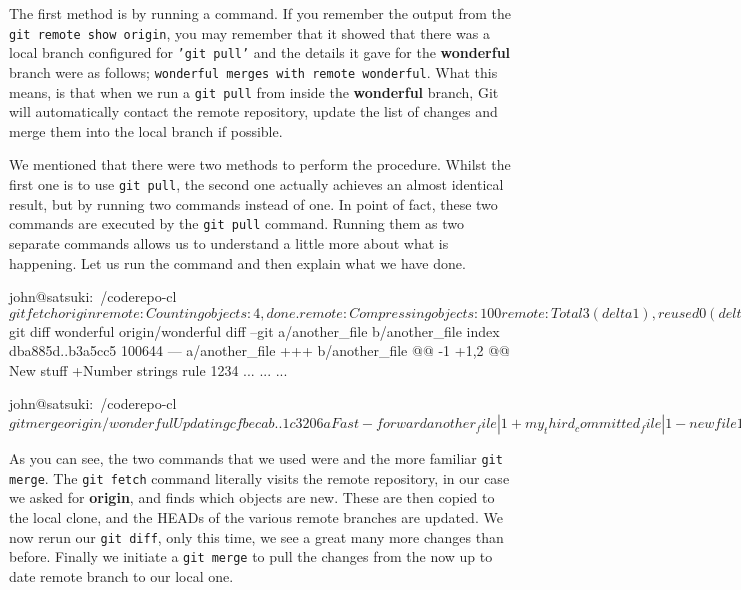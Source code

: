 The first method is by running a  command.
If you remember the output from the \texttt{git remote show origin}, you may remember that it showed that there was a local branch configured for \texttt{'git pull'} and the details it gave for the \textbf{wonderful} branch were as follows; \texttt{wonderful merges with remote wonderful}.
What this means, is that when we run a \texttt{git pull} from inside the \textbf{wonderful} branch, Git will automatically contact the remote repository, update the list of changes and merge them into the local branch if possible.

We mentioned that there were two methods to perform the procedure.
Whilst the first one is to use \texttt{git pull}, the second one actually achieves an almost identical result, but by running two commands instead of one.
In point of fact, these two commands are executed by the \texttt{git pull} command.
Running them as two separate commands allows us to understand a little more about what is happening.
Let us run the command and then explain what we have done.

\begin{code}
john@satsuki:~/coderepo-cl$ git fetch origin
remote: Counting objects: 4, done.
remote: Compressing objects: 100%
remote: Total 3 (delta 1), reused 0 (delta 0)
Unpacking objects: 100%
From /home/john/coderepo
   cfbecab..1c3206a  wonderful  -> origin/wonderful
john@satsuki:~/coderepo-cl$ git diff wonderful origin/wonderful
diff --git a/another_file b/another_file
index dba885d..b3a5cc5 100644
--- a/another_file
+++ b/another_file
@@ -1 +1,2 @@
 New stuff
+Number strings rule 1234
...
...
...

john@satsuki:~/coderepo-cl$ git merge origin/wonderful
Updating cfbecab..1c3206a
Fast-forward
 another_file            |    1 +
 my_third_committed_file |    1 -
 newfile1                |    3 ++-
 newfile2                |    2 +-
 newfile3                |    1 +
 5 files changed, 5 insertions(+), 3 deletions(-)
 delete mode 100644 my_third_committed_file
 create mode 100644 newfile3
john@satsuki:~/coderepo-cl$
\end{code}

As you can see, the two commands that we used were  and the more familiar \texttt{git merge}.
The \texttt{git fetch} command literally visits the remote repository, in our case we asked for \textbf{origin}, and finds which objects are new.
These are then copied to the local clone, and the HEADs of the various remote branches are updated.
We now rerun our \texttt{git diff}, only this time, we see a great many more changes than before.
Finally we initiate a \texttt{git merge} to pull the changes from the now up to date remote branch to our local one.

